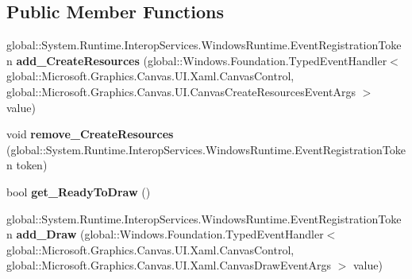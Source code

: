 \subsection*{Public Member Functions}
\begin{DoxyCompactItemize}
\item 
\mbox{\label{interface_microsoft_1_1_graphics_1_1_canvas_1_1_u_i_1_1_xaml_1_1_i_canvas_control_a8a6d5efad4792d05ccdb1542d9522d15}} 
global\+::\+System.\+Runtime.\+Interop\+Services.\+Windows\+Runtime.\+Event\+Registration\+Token {\bfseries add\+\_\+\+Create\+Resources} (global\+::\+Windows.\+Foundation.\+Typed\+Event\+Handler$<$ global\+::\+Microsoft.\+Graphics.\+Canvas.\+U\+I.\+Xaml.\+Canvas\+Control, global\+::\+Microsoft.\+Graphics.\+Canvas.\+U\+I.\+Canvas\+Create\+Resources\+Event\+Args $>$ value)
\item 
\mbox{\label{interface_microsoft_1_1_graphics_1_1_canvas_1_1_u_i_1_1_xaml_1_1_i_canvas_control_a48c306eacb3c3028e82658d035cc92b5}} 
void {\bfseries remove\+\_\+\+Create\+Resources} (global\+::\+System.\+Runtime.\+Interop\+Services.\+Windows\+Runtime.\+Event\+Registration\+Token token)
\item 
\mbox{\label{interface_microsoft_1_1_graphics_1_1_canvas_1_1_u_i_1_1_xaml_1_1_i_canvas_control_af948766c9a45fe4b177283cc36deb1ad}} 
bool {\bfseries get\+\_\+\+Ready\+To\+Draw} ()
\item 
\mbox{\label{interface_microsoft_1_1_graphics_1_1_canvas_1_1_u_i_1_1_xaml_1_1_i_canvas_control_aab6814607ac46d5dfa2fdff6dbb0fa3c}} 
global\+::\+System.\+Runtime.\+Interop\+Services.\+Windows\+Runtime.\+Event\+Registration\+Token {\bfseries add\+\_\+\+Draw} (global\+::\+Windows.\+Foundation.\+Typed\+Event\+Handler$<$ global\+::\+Microsoft.\+Graphics.\+Canvas.\+U\+I.\+Xaml.\+Canvas\+Control, global\+::\+Microsoft.\+Graphics.\+Canvas.\+U\+I.\+Xaml.\+Canvas\+Draw\+Event\+Args $>$ value)
\item 
\mbox{\label{interface_microsoft_1_1_graphics_1_1_canvas_1_1_u_i_1_1_xaml_1_1_i_canvas_control_a7d03879a3626825631ff4dd027e13037}} 

\end{DoxyCompactItemize}
